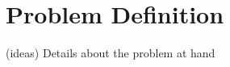 \chapter{Problem Definition}
\label{chapter:problem_definition}

{\color{gray}
(ideas) Details about the problem at hand
}